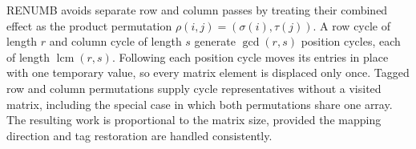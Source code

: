 \documentclass[10pt,letterpaper]{article}
\begin{document}
\begin{tcolorbox}[colback=Ink!4,colframe=Ink,title=Cornell summary]
RENUMB avoids separate row and column passes by treating their combined effect as the product permutation $\rho(i,j)=(\sigma(i),\tau(j))$. A row cycle of length $r$ and column cycle of length $s$ generate $\gcd(r,s)$ position cycles, each of length $\operatorname{lcm}(r,s)$. Following each position cycle moves its entries in place with one temporary value, so every matrix element is displaced only once. Tagged row and column permutations supply cycle representatives without a visited matrix, including the special case in which both permutations share one array. The resulting work is proportional to the matrix size, provided the mapping direction and tag restoration are handled consistently.
\end{tcolorbox}
\end{document}

